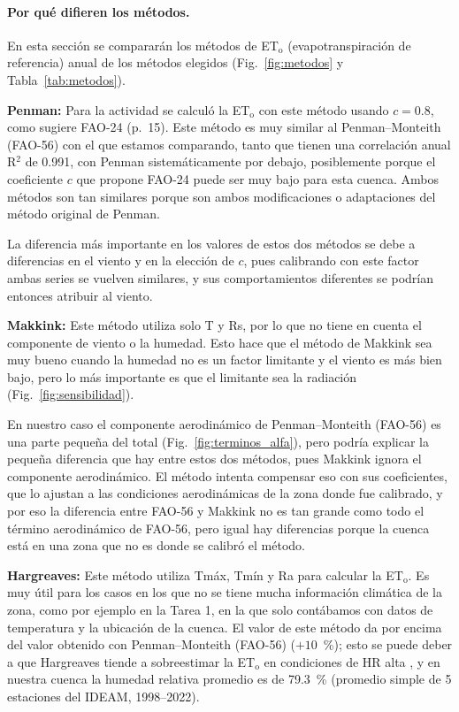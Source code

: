 \documentclass[11pt,letterpaper]{article}
\newcommand{\ETo}{ET$_\mathrm{o}$}
\begin{document}
\paragraph{Por qué difieren los métodos.}
En esta sección se compararán los métodos de \ETo{} (evapotranspiración de referencia) anual de los métodos elegidos (Fig.~\ref{fig:metodos} y Tabla~\ref{tab:metodos}).

\textbf{Penman:} Para la actividad se calculó la \ETo{} con este método usando $c = 0.8$, como sugiere FAO-24
(p.~15). Este método es muy similar al Penman--Monteith (FAO-56) con el que estamos comparando, tanto que tienen una
correlación anual R$^2$ de 0.991, con Penman sistemáticamente por debajo, posiblemente porque el coeficiente $c$ que
propone FAO-24 puede ser muy bajo para esta cuenca. Ambos métodos son tan similares porque son ambos modificaciones o
adaptaciones del método original de Penman.

La diferencia más importante en los valores de estos dos métodos se debe a diferencias en el viento y en la elección
de $c$, pues calibrando con este factor ambas series se vuelven similares, y sus comportamientos diferentes se podrían
entonces atribuir al viento.

\textbf{Makkink:} Este método utiliza solo T y Rs, por lo que no tiene en cuenta el componente de viento o la humedad.
Esto hace que el método de Makkink sea muy bueno cuando la humedad no es un factor limitante y el viento es más bien
bajo, pero lo más importante es que el limitante sea la radiación (Fig.~\ref{fig:sensibilidad}).

En nuestro caso el componente aerodinámico de Penman--Monteith (FAO-56) es una parte pequeña del total (Fig.~\ref{fig:terminos_alfa}), pero podría explicar la
pequeña diferencia que hay entre estos dos métodos, pues Makkink ignora el componente aerodinámico. El método intenta
compensar eso con sus coeficientes, que lo ajustan a las condiciones aerodinámicas de la zona donde fue calibrado, y
por eso la diferencia entre FAO-56 y Makkink no es tan grande como todo el término aerodinámico de FAO-56, pero igual
hay diferencias porque la cuenca está en una zona que no es donde se calibró el método.

\textbf{Hargreaves:} Este método utiliza Tmáx, Tmín y Ra para calcular la \ETo. Es muy útil para los casos en los que
no se tiene mucha información climática de la zona, como por ejemplo en la Tarea 1, en la que solo contábamos con
datos de temperatura y la ubicación de la cuenca. El valor de este método da por encima del valor obtenido con
Penman--Monteith (FAO-56) ($+10$~\%); esto se puede deber a que Hargreaves tiende a sobreestimar la \ETo{} en condiciones de HR
alta \citep[p.~64]{allen1998}, y en nuestra cuenca la humedad relativa promedio es de 79.3~\% (promedio simple de 5
estaciones del IDEAM, 1998--2022).
\end{document}
